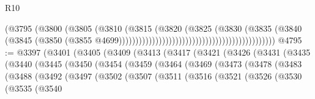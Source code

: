 \begin{lexlean}{R10}
\begin{coremodule}
                                                                        (@3795
                                                                          (@3800
                                                                            (@3805
                                                                              (@3810
                                                                                (@3815
                                                                                  (@3820
                                                                                    (@3825
                                                                                      (@3830
                                                                                        (@3835
                                                                                          (@3840
                                                                                            (@3845
                                                                                              (@3850
                                                                                                (@3855
                                                                                                  @4699)))))))))))))))))))))))))))))))))))))))))))))))
@4795 := @3397
    (@3401
      (@3405
        (@3409
          (@3413
            (@3417
              (@3421
                (@3426
                  (@3431
                    (@3435
                      (@3440
                        (@3445
                          (@3450
                            (@3454
                              (@3459
                                (@3464
                                  (@3469
                                    (@3473
                                      (@3478
                                        (@3483
                                          (@3488
                                            (@3492
                                              (@3497
                                                (@3502
                                                  (@3507
                                                    (@3511
                                                      (@3516
                                                        (@3521
                                                          (@3526
                                                            (@3530
                                                              (@3535
                                                                (@3540

\end{coremodule}
\end{lexlean}
